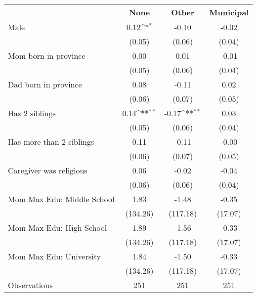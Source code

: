 {
\def\sym#1{\ifmmode^{#1}\else\(^{#1}\)\fi}
\begin{tabular}{l*{3}{c}}
\toprule
                    &\multicolumn{1}{c}{None}&\multicolumn{1}{c}{Other}&\multicolumn{1}{c}{Municipal}\\
\midrule
Male                &        0.12\sym{*}  &       -0.10         &       -0.02         \\
                    &      (0.05)         &      (0.06)         &      (0.04)         \\
\addlinespace
Mom born in province&        0.00         &        0.01         &       -0.01         \\
                    &      (0.05)         &      (0.06)         &      (0.04)         \\
\addlinespace
Dad born in province&        0.08         &       -0.11         &        0.02         \\
                    &      (0.06)         &      (0.07)         &      (0.05)         \\
\addlinespace
Has 2 siblings      &        0.14\sym{**} &       -0.17\sym{**} &        0.03         \\
                    &      (0.05)         &      (0.06)         &      (0.04)         \\
\addlinespace
Has more than 2 siblings&        0.11         &       -0.11         &       -0.00         \\
                    &      (0.06)         &      (0.07)         &      (0.05)         \\
\addlinespace
Caregiver was religious&        0.06         &       -0.02         &       -0.04         \\
                    &      (0.06)         &      (0.06)         &      (0.04)         \\
\addlinespace
Mom Max Edu: Middle School&        1.83         &       -1.48         &       -0.35         \\
                    &    (134.26)         &    (117.18)         &     (17.07)         \\
\addlinespace
Mom Max Edu: High School&        1.89         &       -1.56         &       -0.33         \\
                    &    (134.26)         &    (117.18)         &     (17.07)         \\
\addlinespace
Mom Max Edu: University&        1.84         &       -1.50         &       -0.33         \\
                    &    (134.26)         &    (117.18)         &     (17.07)         \\
\midrule
Observations        &         251         &         251         &         251         \\
\bottomrule
\end{tabular}
}
